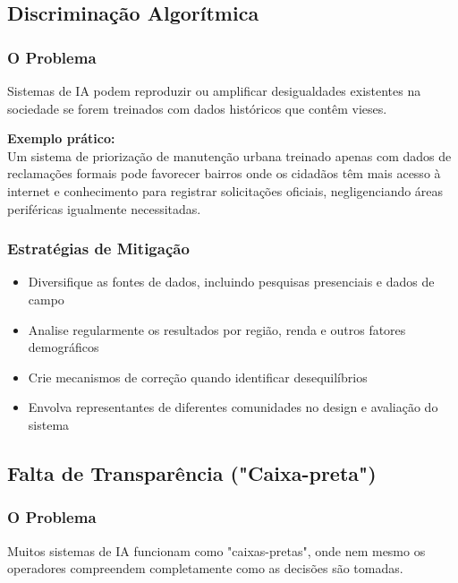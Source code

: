 \documentclass[12pt,a4paper]{article}
\begin{document}
\subsection{Discriminação Algorítmica}

\subsubsection{O Problema}
Sistemas de IA podem reproduzir ou amplificar desigualdades existentes na sociedade se forem treinados com dados históricos que contêm vieses.

\begin{tcolorbox}[example]
\textbf{Exemplo prático:} \\
Um sistema de priorização de manutenção urbana treinado apenas com dados de reclamações formais pode favorecer bairros onde os cidadãos têm mais acesso à internet e conhecimento para registrar solicitações oficiais, negligenciando áreas periféricas igualmente necessitadas.
\end{tcolorbox}

\subsubsection{Estratégias de Mitigação}
\begin{itemize}
    \item Diversifique as fontes de dados, incluindo pesquisas presenciais e dados de campo
    \item Analise regularmente os resultados por região, renda e outros fatores demográficos
    \item Crie mecanismos de correção quando identificar desequilíbrios
    \item Envolva representantes de diferentes comunidades no design e avaliação do sistema
\end{itemize}

\subsection{Falta de Transparência ("Caixa-preta")}

\subsubsection{O Problema}
Muitos sistemas de IA funcionam como "caixas-pretas", onde nem mesmo os operadores compreendem completamente como as decisões são tomadas.
\end{document}
